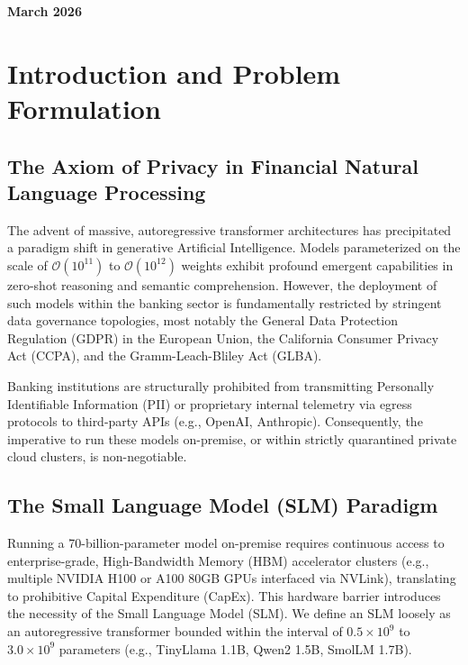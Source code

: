 \documentclass[12pt,a4paper]{report}
\begin{document}
\begin{titlepage}
\begin{center}
        \vfill
        
        \vspace{0.8cm}
        
        \Large
        \textbf{March 2026}
        
    \end{center}
\end{titlepage}

\tableofcontents
\newpage

\chapter{Introduction and Problem Formulation}
\label{chap:introduction}

\section{The Axiom of Privacy in Financial Natural Language Processing}

The advent of massive, autoregressive transformer architectures has precipitated a paradigm shift in generative Artificial Intelligence. Models parameterized on the scale of $\mathcal{O}(10^{11})$ to $\mathcal{O}(10^{12})$ weights exhibit profound emergent capabilities in zero-shot reasoning and semantic comprehension. However, the deployment of such models within the banking sector is fundamentally restricted by stringent data governance topologies, most notably the General Data Protection Regulation (GDPR) in the European Union, the California Consumer Privacy Act (CCPA), and the Gramm-Leach-Bliley Act (GLBA). 

Banking institutions are structurally prohibited from transmitting Personally Identifiable Information (PII) or proprietary internal telemetry via egress protocols to third-party APIs (e.g., OpenAI, Anthropic). Consequently, the imperative to run these models on-premise, or within strictly quarantined private cloud clusters, is non-negotiable. 

\section{The Small Language Model (SLM) Paradigm}

Running a 70-billion-parameter model on-premise requires continuous access to enterprise-grade, High-Bandwidth Memory (HBM) accelerator clusters (e.g., multiple NVIDIA H100 or A100 $80$GB GPUs interfaced via NVLink), translating to prohibitive Capital Expenditure (CapEx). This hardware barrier introduces the necessity of the Small Language Model (SLM). We define an SLM loosely as an autoregressive transformer bounded within the interval of $0.5 \times 10^9$ to $3.0 \times 10^9$ parameters (e.g., TinyLlama 1.1B, Qwen2 1.5B, SmolLM 1.7B). 
\end{document}
